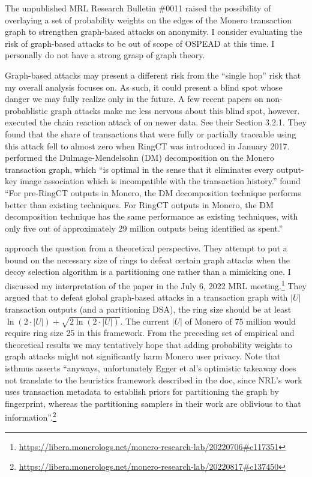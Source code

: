 \documentclass[english]{article}
\begin{document}
The unpublished MRL Research Bulletin \#0011 raised the possibility
of overlaying a set of probability weights on the edges of the Monero
transaction graph to strengthen graph-based attacks on anonymity.
I consider evaluating the risk of graph-based attacks to be out of
scope of OSPEAD at this time. I personally do not have a strong grasp
of graph theory.

Graph-based attacks may present a different risk from the ``single
hop'' risk that my overall analysis focuses on. As such, it could
present a blind spot whose danger we may fully realize only in the
future. A few recent papers on non-probablistic graph attacks make
me less nervous about this blind spot, however. \cite{Ye2020} executed
the chain reaction attack of \cite{Kumar2017} on newer data. See
their Section 3.2.1. They found that the share of transactions that
were fully or partially traceable using this attack fell to almost
zero when RingCT was introduced in January 2017. \cite{Vijayakumaran2021}
performed the Dulmage-Mendelsohn (DM) decomposition on the Monero
transaction graph, which ``is optimal in the sense that it eliminates
every output-key image association which is incompatible with the
transaction history.'' \cite{Vijayakumaran2021} found ``For pre-RingCT
outputs in Monero, the DM decomposition technique performs better
than existing techniques. For RingCT outputs in Monero, the DM decomposition
technique has the same performance as existing techniques, with only
five out of approximately 29 million outputs being identified as spent.'' 

\cite{Egger2022} approach the question from a theoretical perspective.
They attempt to put a bound on the necessary size of rings to defeat
certain graph attacks when the decoy selection algorithm is a partitioning
one rather than a mimicking one. I discussed my interpretation of
the paper in the July 6, 2022 MRL meeting.\footnote{\href{https://libera.monerologs.net/monero-research-lab/20220706\#c117351}{https://libera.monerologs.net/monero-research-lab/20220706\#c117351}}
They argued that to defeat global graph-based attacks in a transaction
graph with $|U|$ transaction outputs (and a partitioning DSA), the
ring size should be at least $\ln(2\cdot|U|)+\sqrt{2\ln(2\cdot|U|)}$.
The current $|U|$ of Monero of 75 million would require ring size
25 in this framework. From the preceding set of empirical and theoretical
results we may tentatively hope that adding probability weights to
graph attacks might not significantly harm Monero user privacy. Note
that isthmus asserts ``anyways, unfortunately Egger et al's optimistic
takeaway does not translate to the heuristics framework described
in the doc, since NRL's work uses transaction metadata to establish
priors for partitioning the graph by fingerprint, whereas the partitioning
samplers in their work are oblivious to that information''.\footnote{\href{https://libera.monerologs.net/monero-research-lab/20220817\#c137450}{https://libera.monerologs.net/monero-research-lab/20220817\#c137450}}
\end{document}
